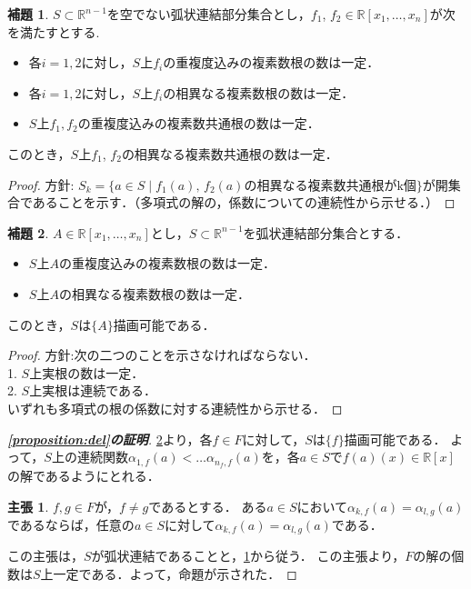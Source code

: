 \documentclass[uplatex, dvipdfmx]{jsarticle}
\newcommand{\R}{\mathbb{R}}
\theoremstyle{definition}
\newtheorem{lemma}{補題}[section]
\newtheorem*{claim*}{主張}
\begin{document}
\begin{lemma}\label{lemma:del_1}
$S \subset \R^{n-1}$を空でない弧状連結部分集合とし，$f_1$, $f_2 \in \R[x_1, \dots, x_n]$が次を満たすとする.
\begin{itemize}
\item 各$i=1, 2$に対し，$S$上$f_i$の重複度込みの複素数根の数は一定．
\item 各$i=1, 2$に対し，$S$上$f_i$の相異なる複素数根の数は一定．
\item $S$上$f_1, f_2$の重複度込みの複素数共通根の数は一定．
\end{itemize}
このとき，$S$上$f_1$, $f_2$の相異なる複素数共通根の数は一定．
\end{lemma}
\begin{proof}
方針: $S_k = \{a \in S \mid \text{$f_1(a)$, $f_2(a)$の相異なる複素数共通根がk個} \}$が開集合であることを示す．（多項式の解の，係数についての連続性から示せる．）

\end{proof}

\begin{lemma}\label{lemma:del_2}
$A \in \R[x_1, \dots, x_n]$とし，$S \subset \R^{n-1}$を弧状連結部分集合とする．
\begin{itemize}
\item $S$上$A$の重複度込みの複素数根の数は一定．
\item $S$上$A$の相異なる複素数根の数は一定．
\end{itemize}
このとき，$S$は$\{A\}$描画可能である．
\end{lemma}

\begin{proof}
方針:次の二つのことを示さなければならない．\\
1.  $S$上実根の数は一定．\\
2.  $S$上実根は連続である．\\
いずれも多項式の根の係数に対する連続性から示せる．
\end{proof}

\begin{proof}[{\bf \cref{proposition:del}の証明}]
\cref{lemma:del_2}より，各$f \in F$に対して，$S$は$\{f\}$描画可能である．
よって，$S$上の連続関数$\alpha_{1,f}(a) < \dots \alpha_{n_f, f}(a)$を，各$a \in S$で$f(a)(x) \in \R[x]$の解であるようにとれる．

\begin{claim*}
$f, g \in F$が，$f \neq g$であるとする．
ある$a \in S$において$\alpha_{k,f}(a) = \alpha_{l,g}(a)$であるならば，任意の$a \in S$に対して$\alpha_{k,f}(a) = \alpha_{l,g}(a)$である．
\end{claim*}

この主張は，$S$が弧状連結であることと，\cref{lemma:del_1}から従う．
この主張より，$F$の解の個数は$S$上一定である．よって，命題が示された．
\end{proof}
\end{document}
